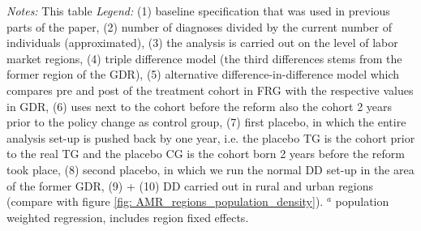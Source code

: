 \begin{landscape}
\begin{table}[htbp]
\begin{threeparttable}
{\begin{tabular}{l*{10}{c}}
					\bottomrule
			\end{tabular}}
	\end{threeparttable} 
		\begin{minipage}{0.87\linewidth}
		\scriptsize \emph{Notes:} This table %
		\newline \emph{Legend:} (1) baseline specification that was used in previous parts of the paper, (2) number of diagnoses divided by the current number of individuals (approximated), (3) the analysis is carried out on the level of labor market regions, (4) triple difference model (the third differences stems from the former region of the GDR), (5) alternative difference-in-difference model which compares pre and post of the treatment cohort in FRG with the respective values in GDR, (6) uses next to the cohort before the reform also the cohort 2 years prior to the policy change as control group, (7) first placebo, in which the entire analysis set-up is pushed back by one year, i.e. the placebo TG is the cohort prior to the real TG and the placebo CG is the cohort born 2 years before the reform took place, (8) second placebo, in which we run the normal DD set-up in the area of the former GDR, (9) + (10)  DD carried out in rural and urban regions (compare with figure \ref{fig: AMR_regions_population_density}). \newline
		\hspace{10 pt}$^a$ population weighted regression, includes region fixed effects.
	\end{minipage}
\end{table} 
	\vspace*{\fill}\clearpage
\end{landscape}


